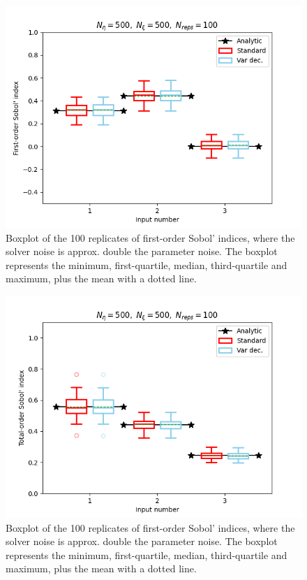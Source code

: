 \begin{figure}
    \centering
    \includegraphics{figures/large_c/si_eta500_xi500.png}
    \caption{Boxplot of the 100 replicates of first-order Sobol’ indices, where the solver noise is approx. double the parameter noise. The boxplot represents the minimum, first-quartile, median, third-quartile and maximum, plus the mean with a dotted line.}
    \label{fig:largec-eta500-si}
\end{figure}
\begin{figure}
    \centering
    \includegraphics{figures/large_c/ti_eta500_xi500.png}
    \caption{Boxplot of the 100 replicates of first-order Sobol’ indices, where the solver noise is approx. double the parameter noise. The boxplot represents the minimum, first-quartile, median, third-quartile and maximum, plus the mean with a dotted line.}
    \label{fig:largec-eta500-ti}
\end{figure}


